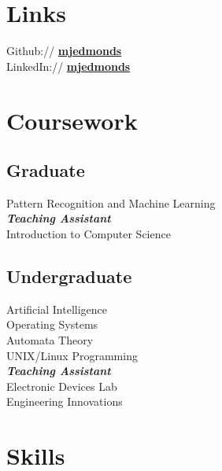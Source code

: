 \documentclass[letterpaper]{deedy-resume} %
\begin{document}
\begin{minipage}[t]{0.32\textwidth}
\section{Links} 

Github:// \href{https://github.com/mjedmonds}{\bf mjedmonds} \\
LinkedIn:// \href{https://www.linkedin.com/in/mjedmonds}{\bf mjedmonds} \\

\sectionspace %


\section{Coursework}

\subsection{Graduate}

Pattern Recognition and Machine Learning\\
{\footnotesize \textit{\textbf{Teaching Assistant}}} \\
Introduction to Computer Science

\sectionspace %


\subsection{Undergraduate}

Artificial Intelligence \\
Operating Systems \\
Automata Theory\\
UNIX/Linux Programming \\
{\footnotesize \textit{\textbf{Teaching Assistant}}} \\
Electronic Devices Lab\\
Engineering Innovations

\sectionspace %


\section{Skills}


\end{minipage}
\end{document}
